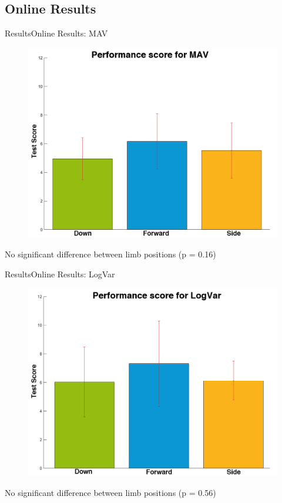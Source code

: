 \documentclass[10pt]{beamer}
\begin{document}
\subsection{Online Results}
\begin{frame}{Results}{Online Results: MAV}
\begin{figure}
	\includegraphics[scale=0.27]{figures/gotItMAV.png}
\end{figure}
No significant difference between limb positions (p = 0.16)
\end{frame}

\begin{frame}{Results}{Online Results: LogVar}
\begin{figure}
	\includegraphics[scale=0.27]{figures/gotItLogVar.png}
\end{figure}
No significant difference between limb positions (p = 0.56)
\end{frame}
\end{document}
